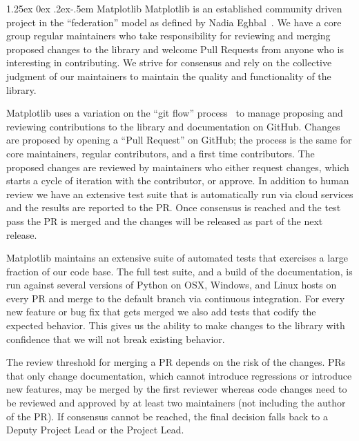\documentclass[12pt]{article}
\makeatletter
\numberwithin{page}{section}
\renewcommand{\paragraph}{%
  \@startsection{paragraph}{4}%
  {\z@}{1.25ex \@plus 0ex \@minus .2ex}{-.5em}%
  {\normalfont\normalsize\itshape\bfseries}%
}
\makeatother
\begin{document}
\paragraph{Matplotlib}
Matplotlib is an established community driven project in the
``federation'' model as defined by Nadia Eghbal~\cite{eghbal_2020}.
We have a core group regular maintainers who take responsibility for
reviewing and merging proposed changes to the library and welcome Pull
Requests from anyone who is interesting in contributing.  We strive
for consensus and rely on the collective judgment of our maintainers
to maintain the quality and functionality of the library.

Matplotlib uses a variation on the ``git flow'' process~\cite{ghflow}
to manage proposing and reviewing contributions to the library and
documentation on GitHub.  Changes are proposed by opening a ``Pull
Request'' on GitHub; the process is the same for core maintainers,
regular contributors, and a first time contributors.  The proposed
changes are reviewed by maintainers who either request changes, which
starts a cycle of iteration with the contributor, or approve.  In
addition to human review we have an extensive test suite that is
automatically run via cloud services and the results are reported to
the PR.  Once consensus is reached and the test pass the PR is merged
and the changes will be released as part of the next release.

Matplotlib maintains an extensive suite of automated tests that
exercises a large fraction of our code base.  The full test suite, and
a build of the documentation, is run against several versions of
Python on OSX, Windows, and Linux hosts on every PR and merge to the
default branch via continuous integration.  For every new feature or
bug fix that gets merged we also add tests that codify the expected
behavior.  This gives us the ability to make changes to the library
with confidence that we will not break existing behavior.

The review threshold for merging a PR depends on the risk of the changes.  PRs
that only change documentation, which cannot introduce regressions or introduce
new features, may be merged by the first reviewer whereas code changes need to
be reviewed and approved by at least two maintainers (not including the author
of the PR).  If consensus cannot be reached, the final decision falls back to a
Deputy Project Lead or the Project Lead.
\end{document}
